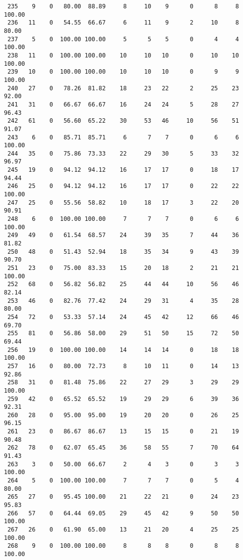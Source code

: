 \begin{verbatim}
 235    9    0   80.00  88.89     8     10    9      0      8     8   100.00
 236   11    0   54.55  66.67     6     11    9      2     10     8    80.00
 237    5    0  100.00 100.00     5      5    5      0      4     4   100.00
 238   11    0  100.00 100.00    10     10   10      0     10    10   100.00
 239   10    0  100.00 100.00    10     10   10      0      9     9   100.00
 240   27    0   78.26  81.82    18     23   22      2     25    23    92.00
 241   31    0   66.67  66.67    16     24   24      5     28    27    96.43
 242   61    0   56.60  65.22    30     53   46     10     56    51    91.07
 243    6    0   85.71  85.71     6      7    7      0      6     6   100.00
 244   35    0   75.86  73.33    22     29   30      5     33    32    96.97
 245   19    0   94.12  94.12    16     17   17      0     18    17    94.44
 246   25    0   94.12  94.12    16     17   17      0     22    22   100.00
 247   25    0   55.56  58.82    10     18   17      3     22    20    90.91
 248    6    0  100.00 100.00     7      7    7      0      6     6   100.00
 249   49    0   61.54  68.57    24     39   35      7     44    36    81.82
 250   48    0   51.43  52.94    18     35   34      9     43    39    90.70
 251   23    0   75.00  83.33    15     20   18      2     21    21   100.00
 252   68    0   56.82  56.82    25     44   44     10     56    46    82.14
 253   46    0   82.76  77.42    24     29   31      4     35    28    80.00
 254   72    0   53.33  57.14    24     45   42     12     66    46    69.70
 255   81    0   56.86  58.00    29     51   50     15     72    50    69.44
 256   19    0  100.00 100.00    14     14   14      0     18    18   100.00
 257   16    0   80.00  72.73     8     10   11      0     14    13    92.86
 258   31    0   81.48  75.86    22     27   29      3     29    29   100.00
 259   42    0   65.52  65.52    19     29   29      6     39    36    92.31
 260   28    0   95.00  95.00    19     20   20      0     26    25    96.15
 261   23    0   86.67  86.67    13     15   15      0     21    19    90.48
 262   78    0   62.07  65.45    36     58   55      7     70    64    91.43
 263    3    0   50.00  66.67     2      4    3      0      3     3   100.00
 264    5    0  100.00 100.00     7      7    7      0      5     4    80.00
 265   27    0   95.45 100.00    21     22   21      0     24    23    95.83
 266   57    0   64.44  69.05    29     45   42      9     50    50   100.00
 267   26    0   61.90  65.00    13     21   20      4     25    25   100.00
 268    9    0  100.00 100.00     8      8    8      0      8     8   100.00

\end{verbatim}
